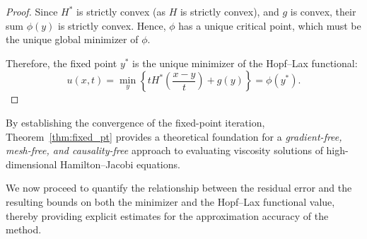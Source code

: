 \documentclass[review,hidelinks,onefignum,onetabnum]{siamart250106}
\begin{document}
\begin{proof}
Since \( H^* \) is strictly convex (as \( H \) is strictly convex), and \( g \) is convex, their sum \( \phi(y) \) is strictly convex. Hence, \( \phi \) has a unique critical point, which must be the unique global minimizer of \( \phi \).

Therefore, the fixed point \( y^* \) is the unique minimizer of the Hopf--Lax functional:
\[
u(x,t) = \min_y \left\{ t H^*\left( \frac{x - y}{t} \right) + g(y) \right\} = \phi(y^*).
\]
\end{proof}


By establishing the convergence of the fixed-point iteration, Theorem~\ref{thm:fixed_pt} provides a theoretical foundation for a \emph{gradient-free, mesh-free, and causality-free} approach to evaluating viscosity solutions of high-dimensional Hamilton--Jacobi equations.

We now proceed to quantify the relationship between the residual error and the resulting bounds on both the minimizer and the Hopf--Lax functional value, thereby providing explicit estimates for the approximation accuracy of the method.



\end{document}
